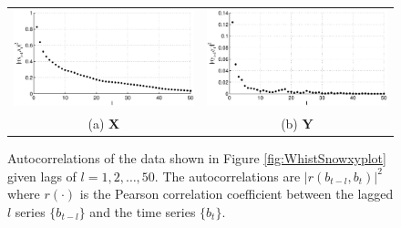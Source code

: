 \documentclass{article}[10pt]
\begin{document}
\begin{figure}[ht]
\begin{tabular}{cc}
\includegraphics[scale=0.48]{WhistlerDailyExample_autocorrX.eps} & \includegraphics[scale=0.48]{WhistlerDailyExample_autocorrY.eps} \\
(a) $\mathbf{X}$ & (b) $\mathbf{Y}$
\end{tabular}
\caption{Autocorrelations of the data shown in Figure \ref{fig:WhistSnowxyplot} given lags of $l=1,2,\ldots,50$.  The autocorrelations are $|r(b_{t-l},b_t)|^2$ where $r(\cdot)$ is the Pearson correlation coefficient between the lagged $l$ series $\{b_{t-l}\}$ and the time series $\{b_{t}\}$.}
\label{fig:WhistSnowxyautocorr}
\end{figure}
\end{document}
